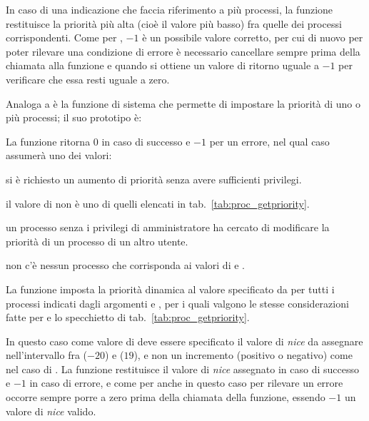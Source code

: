 In caso di una indicazione che faccia riferimento a più processi, la funzione
restituisce la priorità più alta (cioè il valore più basso) fra quelle dei
processi corrispondenti. Come per , $-1$ è un possibile valore
corretto, per cui di nuovo per poter rilevare una condizione di errore è
necessario cancellare sempre  prima della chiamata alla funzione e
quando si ottiene un valore di ritorno uguale a $-1$ per verificare che essa
resti uguale a zero.

Analoga a  è la funzione di sistema  che
permette di impostare la priorità di uno o più processi; il suo prototipo è:

\begin{funcproto}{ 
}
{La funzione ritorna $0$ in caso di successo e $-1$ per un errore, nel qual
caso  assumerà uno dei valori:
\begin{errlist}
\item[\errcode{EACCES}] si è richiesto un aumento di priorità senza avere
  sufficienti privilegi.
\item[\errcode{EINVAL}] il valore di  non è uno di quelli
  elencati in tab.~\ref{tab:proc_getpriority}.
\item[\errcode{EPERM}] un processo senza i privilegi di amministratore ha
  cercato di modificare la priorità di un processo di un altro utente.
\item[\errcode{ESRCH}] non c'è nessun processo che corrisponda ai valori di
   e .
\end{errlist}}
\end{funcproto}

La funzione imposta la priorità dinamica al valore specificato da 
per tutti i processi indicati dagli argomenti  e , per
i quali valgono le stesse considerazioni fatte per  e lo
specchietto di tab.~\ref{tab:proc_getpriority}. 

In questo caso come valore di  deve essere specificato il valore
di \textit{nice} da assegnare nell'intervallo fra  ($-20$) e
 ($19$), e non un incremento (positivo o negativo) come nel
caso di . La funzione restituisce il valore di \textit{nice}
assegnato in caso di successo e $-1$ in caso di errore, e come per 
anche in questo caso per rilevare un errore occorre sempre porre a zero
 prima della chiamata della funzione, essendo $-1$ un valore di
\textit{nice} valido.

